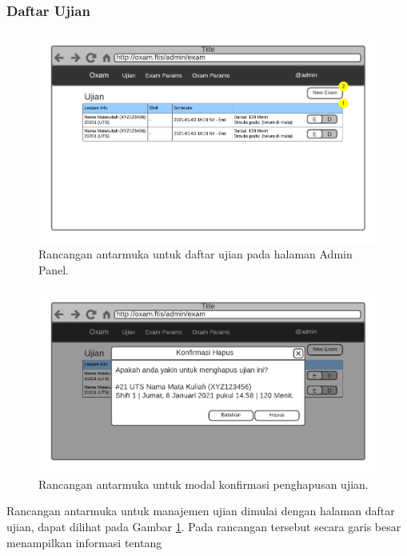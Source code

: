 \subsubsection{Daftar Ujian}
    \begin{figure}
        \centering
        \includegraphics{Gambar/mockups/Mockup--Admin - Exam Listing.pdf}
        \caption{Rancangan antarmuka untuk daftar ujian pada halaman Admin Panel.}
        \label{fig:mockup_admin_exam_listing}
    \end{figure}\begin{figure}
        \centering
        \includegraphics{Gambar/mockups/Mockup--Admin - Exam Delete.pdf}
        \caption{Rancangan antarmuka untuk modal konfirmasi penghapusan ujian.}
        \label{fig:mockup_admin_exam_listing-delete}
    \end{figure}
    Rancangan antarmuka untuk manajemen ujian dimulai dengan halaman daftar
    ujian, dapat dilihat pada Gambar \ref{fig:mockup_admin_exam_listing}. Pada
    rancangan tersebut secara garis besar menampilkan informasi tentang
